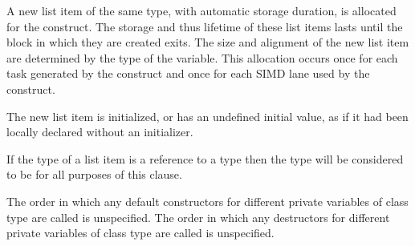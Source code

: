 \begin{ccppspecific}
A new list item of the same type, with automatic storage duration, is allocated for the
construct. The storage and thus lifetime of these list items lasts until the block in which
they are created exits. The size and alignment of the new list item are determined by the
type of the variable. This allocation occurs once for each task generated by the construct
and once for each SIMD lane used by the construct.

The new list item is initialized, or has an undefined initial value, as if it had been locally
declared without an initializer.
\end{ccppspecific}
%
\begin{cppspecific}
If the type of a list item is a reference to a type  then the type will be considered to be
 for all purposes of this clause.

The order in which any default constructors for different private variables of class type
are called is unspecified. The order in which any destructors for different private
variables of class type are called is unspecified.
\end{cppspecific}
%
